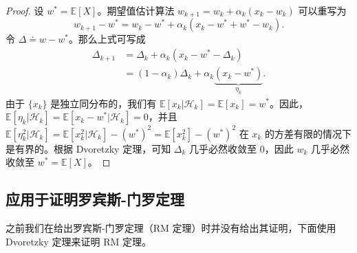 \begin{proof}
设 $w^* = \mathbb{E}[X]$。期望值估计算法 $w_{k+1} = w_k + \alpha_k (x_k - w_k)$ 可以重写为
\begin{equation}
w_{k+1} - w^* = w_k - w^* + \alpha_k (x_k - w^* + w^* - w_k).
\end{equation}
令 $\Delta \doteq w - w^*$。那么上式可写成
\begin{equation}
\begin{aligned}
\Delta_{k+1} &= \Delta_k + \alpha_k (x_k - w^* - \Delta_k) \\
&= (1 - \alpha_k) \Delta_k + \alpha_k \underbrace{(x_k - w^*)}_{\eta_k}.
\end{aligned}
\end{equation}
由于 $\{x_k\}$ 是独立同分布的，我们有 $\mathbb{E}[x_k | \mathcal{H}_k] = \mathbb{E}[x_k] = w^*$。因此，$\mathbb{E}[\eta_k | \mathcal{H}_k] = \mathbb{E}[x_k - w^* | \mathcal{H}_k] = 0$，并且 $\mathbb{E}[\eta_k^2 | \mathcal{H}_k] = \mathbb{E}[x_k^2 | \mathcal{H}_k] - (w^*)^2 = \mathbb{E}[x_k^2] - (w^*)^2$ 在 $x_k$ 的方差有限的情况下是有界的。根据 Dvoretzky 定理，可知 $\Delta_k$ 几乎必然收敛至 0，因此 $w_k$ 几乎必然收敛至 $w^* = \mathbb{E}[X]$。
\end{proof}

\subsection{应用于证明罗宾斯-门罗定理}
\label{sec:rl-sa-dvor-rm}

之前我们在给出罗宾斯-门罗定理（RM 定理）时并没有给出其证明，下面使用 Dvoretzky 定理来证明 RM 定理。

